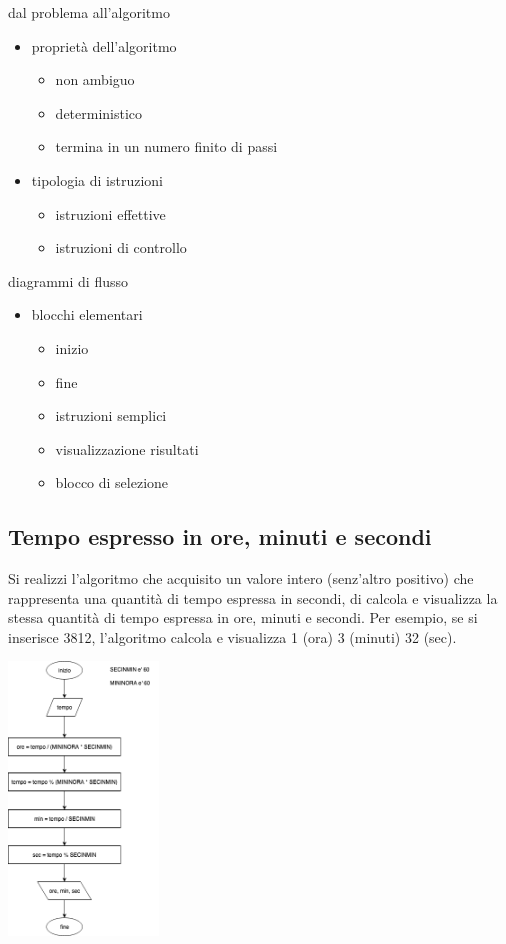 dal problema all'algoritmo 

\begin{itemize}
\item  propriet\`a dell'algoritmo
    \begin{itemize}
    \item non ambiguo
    \item deterministico
    \item termina in un numero finito di passi
   	\end{itemize}	
\item  tipologia di istruzioni
    \begin{itemize}
    \item istruzioni effettive
    \item istruzioni di controllo
    \end{itemize}   
\end{itemize}

diagrammi di flusso

\begin{itemize}
\item  blocchi elementari
    \begin{itemize}
    \item inizio
    \item fine
    \item istruzioni semplici
    \item visualizzazione risultati
    \item blocco di selezione
    \end{itemize}   
\end{itemize}

\mysep{}

\subsection{Tempo espresso in ore, minuti e secondi}
Si realizzi l'algoritmo che acquisito un valore intero (senz'altro positivo) che rappresenta una quantit\`a di tempo espressa in secondi, di calcola e visualizza la stessa quantit\`a di tempo espressa in ore, minuti e secondi. Per esempio, se si inserisce 3812, l'algoritmo calcola e visualizza 1 (ora) 3 (minuti) 32 (sec).

\begin{center}
    \includegraphics[width=0.3\textwidth]{./tempo.png}
\end{center}



